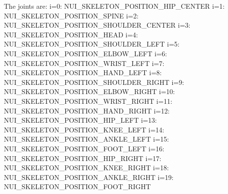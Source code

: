The joints are:
i=0: NUI_SKELETON_POSITION_HIP_CENTER
i=1: NUI_SKELETON_POSITION_SPINE
i=2: NUI_SKELETON_POSITION_SHOULDER_CENTER
i=3: NUI_SKELETON_POSITION_HEAD
i=4: NUI_SKELETON_POSITION_SHOULDER_LEFT
i=5: NUI_SKELETON_POSITION_ELBOW_LEFT
i=6: NUI_SKELETON_POSITION_WRIST_LEFT
i=7: NUI_SKELETON_POSITION_HAND_LEFT
i=8: NUI_SKELETON_POSITION_SHOULDER_RIGHT
i=9: NUI_SKELETON_POSITION_ELBOW_RIGHT
i=10: NUI_SKELETON_POSITION_WRIST_RIGHT
i=11: NUI_SKELETON_POSITION_HAND_RIGHT
i=12: NUI_SKELETON_POSITION_HIP_LEFT
i=13: NUI_SKELETON_POSITION_KNEE_LEFT
i=14: NUI_SKELETON_POSITION_ANKLE_LEFT
i=15: NUI_SKELETON_POSITION_FOOT_LEFT
i=16: NUI_SKELETON_POSITION_HIP_RIGHT
i=17: NUI_SKELETON_POSITION_KNEE_RIGHT
i=18: NUI_SKELETON_POSITION_ANKLE_RIGHT
i=19: NUI_SKELETON_POSITION_FOOT_RIGHT

